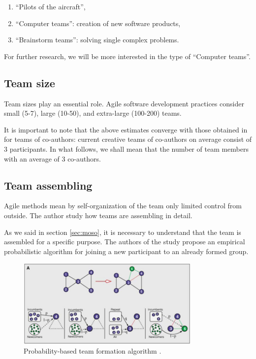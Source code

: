 \documentclass[12pt]{report}
\theoremstyle{definition}
\providecommand{\tightlist}{%
	\setlength{\itemsep}{0pt}\setlength{\parskip}{0pt}}
\begin{document}
\begin{enumerate}
	\tightlist
	\item ``Pilots of the aircraft'',
	\item ``Computer teams'': creation of new software products,
	\item ``Brainstorm teams'': solving single complex problems.
\end{enumerate}

For further research, we will be more interested in the type of ``Computer teams''.

\subsection{Team size}

Team sizes play an essential role. 
Agile software development practices consider small (5-7), large (10-50), and extra-large (100-200) \cite{alnuaimi2010team} teams.

It is important to note that the above estimates converge with those obtained in \cite{kradoya2016structure} for teams of co-authors: current creative teams of co-authors on average consist of 3 participants. 
In what follows, we shall mean that the number of team members with an average of 3 co-authors.

\subsection{Team assembling}

Agile methods \cite{fowler2001agile} mean by self-organization of the team only limited control from outside. 
The author study how teams are assembling in detail.

As we said in section \ref{sec:moso}, it is necessary to understand that the team is assembled for a specific purpose. 
The authors of the \cite{guimera2005team} study propose an empirical probabilistic algorithm for joining a new participant to an already formed group.

\begin{figure}[ht]
	\centering
	\includegraphics[width=0.8\textwidth]{guimera2}
	\caption{Probability-based team formation algorithm \cite{guimera2005team}.}
	\label{fig:ta2}	
\end{figure}
\end{document}
